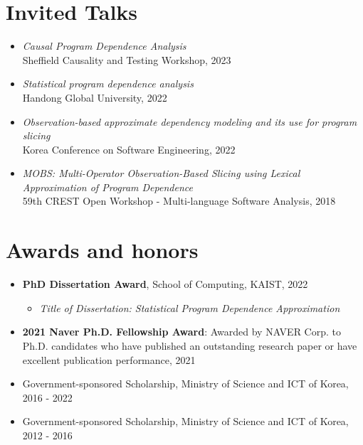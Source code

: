 \documentclass[letterpaper,11pt]{article}
\begin{document}
\section{Invited Talks}
\begin{itemize}
  \item \emph{Causal Program Dependence Analysis} \\ Sheffield Causality and Testing Workshop, 2023
  \item \emph{Statistical program dependence analysis} \\ Handong Global University, 2022
  \item \emph{Observation-based approximate dependency modeling and its use for program slicing} \\ Korea Conference on Software Engineering, 2022
  \item \emph{MOBS: Multi-Operator Observation-Based Slicing using Lexical Approximation of Program Dependence} \\ 59th CREST Open Workshop - Multi-language Software Analysis, 2018
\end{itemize}



\section{Awards and honors}
\begin{itemize}
  \item \textbf{PhD Dissertation Award}, School of Computing, KAIST, 2022
        \vspace{-5pt}\begin{itemize}
          \item \emph{Title of Dissertation: Statistical Program Dependence Approximation}
        \end{itemize}
  \item \textbf{2021 Naver Ph.D. Fellowship Award}: Awarded by NAVER Corp. to Ph.D. candidates who have published an outstanding research paper or have excellent publication performance, 2021
  \item Government-sponsored Scholarship, Ministry of Science and ICT of Korea, 2016 - 2022
  \item Government-sponsored Scholarship, Ministry of Science and ICT of Korea, 2012 - 2016
\end{itemize}
\end{document}
